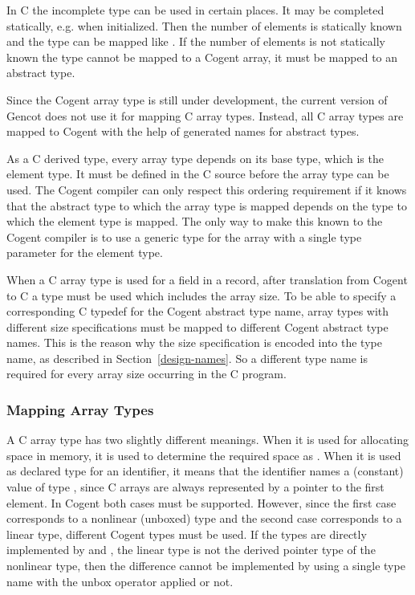 In C the incomplete type  can be used in certain places. It may be completed statically, e.g. 
when initialized. Then the number of elements is statically known and the type can be mapped like .
If the number of elements is not statically known the type cannot be mapped to a Cogent array, it must be mapped 
to an abstract type.

Since the Cogent array type is still under development, the current version of Gencot does not use it for
mapping C array types. Instead, all C array types are mapped to Cogent with the help of generated names for 
abstract types.

As a C derived type, every array type depends on its base type, which is the element type. It must be defined in
the C source before the array type can be used. The Cogent compiler can only respect this ordering requirement if
it knows that the abstract type to which the array type is mapped depends on the type to which the element type
is mapped. The only way to make this known to the Cogent compiler is to use a generic type for the array with
a single type parameter for the element type. 

When a C array type is used for a field in a record, after translation from Cogent to C a type
must be used which includes the array size. To be able to specify a corresponding C typedef for the 
Cogent abstract type name, array types with different size specifications must be mapped to different 
Cogent abstract type names. This is the reason why the size specification is encoded into the type name,
as described in Section~\ref{design-names}. So a different type name is required for every array size 
occurring in the C program.

\subsubsection{Mapping Array Types}

A C array type  has two slightly different meanings. When it is used for allocating space in memory,
it is used to determine the required space as . When it is used as declared type for an 
identifier, it means that the identifier names a (constant) value of type , since C arrays are 
always represented by a pointer to the first element. In Cogent both cases must be supported. However, since 
the first case corresponds to a nonlinear (unboxed) type and the second case corresponds to a linear type, 
different Cogent types must be used. If the types are directly implemented by  and , the 
linear type is not the derived pointer type of the nonlinear type, then the difference cannot be implemented 
by using a single type name with the unbox operator applied or not.

